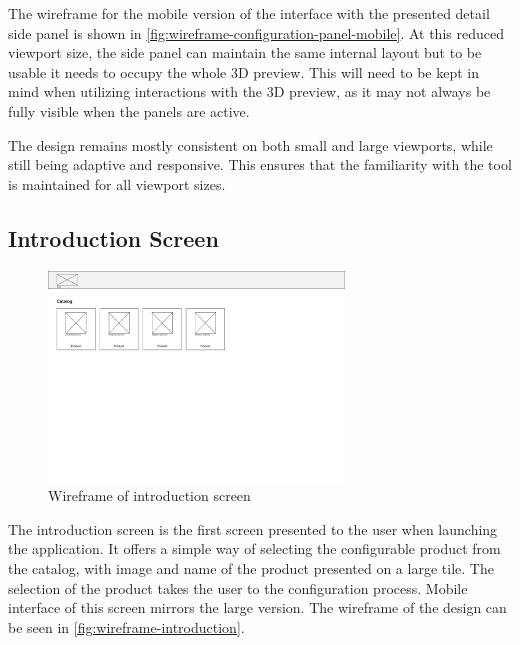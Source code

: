 The wireframe for the mobile version of the interface with the presented detail side panel is shown in \autoref{fig:wireframe-configuration-panel-mobile}. At this reduced viewport size, the side panel can maintain the same internal layout but to be usable it needs to occupy the whole 3D preview. This will need to be kept in mind when utilizing interactions with the 3D preview, as it may not always be fully visible when the panels are active. 

The design remains mostly consistent on both small and large viewports, while still being adaptive and responsive. This ensures that the familiarity with the tool is maintained for all viewport sizes.

\subsection{Introduction Screen}

\begin{figure}[h!]
\centering
\includegraphics[width=0.7\textwidth]{images/wireframe_introduction_default.png}
\caption{Wireframe of introduction screen}
\label{fig:wireframe-introduction}
\end{figure}

The introduction screen is the first screen presented to the user when launching the application. It offers a simple way of selecting the configurable product from the catalog, with image and name of the product presented on a large tile. The selection of the product takes the user to the configuration process. Mobile interface of this screen mirrors the large version. The wireframe of the design can be seen in \autoref{fig:wireframe-introduction}.

